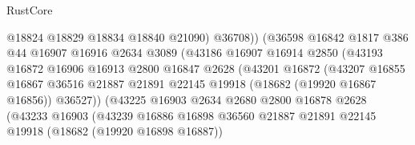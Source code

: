 \begin{lexlean}{RustCore}
\begin{coremodule}
                                      @18824
                                      @18829
                                      @18834
                                      @18840
                                      @21090)
                                    @36708))
                                (@36598
                                  @16842
                                  @1817
                                  @386
                                  @44
                                  @16907
                                  @16916
                                  @2634
                                  @3089
                                  (@43186
                                    @16907
                                    @16914
                                    @2850
                                    (@43193
                                      @16872
                                      @16906
                                      @16913
                                      @2800
                                      @16847
                                      @2628
                                      (@43201
                                        @16872
                                        (@43207
                                          @16855
                                          @16867
                                          @36516
                                          @21887
                                          @21891
                                          @22145
                                          @19918
                                          (@18682 (@19920 @16867 @16856))
                                          @36527))
                                      (@43225
                                        @16903
                                        @2634
                                        @2680
                                        @2800
                                        @16878
                                        @2628
                                        (@43233
                                          @16903
                                          (@43239
                                            @16886
                                            @16898
                                            @36560
                                            @21887
                                            @21891
                                            @22145
                                            @19918
                                            (@18682 (@19920 @16898 @16887))

\end{coremodule}
\end{lexlean}
